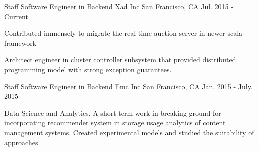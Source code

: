 

\begin{cventries}

  \cventry
    {Staff Software Engineer in Backend } %
    {Xad Inc} %
    {San Francisco, CA} %
    {Jul. 2015 - Current} %
    {
      \begin{cvitems} %
        \item {Contributed immensely to migrate the  real time auction server in newer scala framework} 
        \item {Architect engineer in cluster controller subsystem that provided distributed programming model with strong exception guarantees.}
      \end{cvitems}
    }

  \cventry
    {Staff Software Engineer in Backend } %
    {Emc Inc} %
    {San Francisco, CA} %
    {Jan. 2015 - July. 2015} %
    {
      \begin{cvitems} %
        \item {Data Science and Analytics. A short term work in  breaking ground for incorporating recommender system in storage usage analytics of content management systems. Created experimental models and studied the suitability of approaches.}
      \end{cvitems}
    }




\end{cventries}
